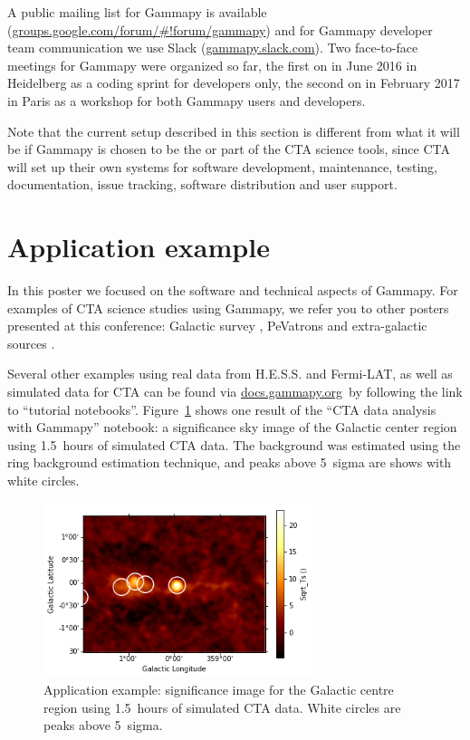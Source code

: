 \documentclass{PoS}
\newcommand{\urlGammapySlack}{\href{https://gammapy.slack.com}{gammapy.slack.com}}
\newcommand{\urlGammapyDocs}{\href{http://docs.gammapy.org}{docs.gammapy.org}}
\newcommand{\urlGammapyForum}{\href{https://groups.google.com/forum/\#!forum/gammapy}{groups.google.com/forum/\#!forum/gammapy}}
\begin{document}
A public mailing list for Gammapy is available (\urlGammapyForum) and for
Gammapy developer team communication we use Slack (\urlGammapySlack). Two
face-to-face meetings for Gammapy were organized so far, the first on in June
2016 in Heidelberg as a coding sprint for developers only, the second on in
February 2017 in Paris as a workshop for both Gammapy users and developers.

Note that the current setup described in this section is different from what it
will be if Gammapy is chosen to be the or part of the CTA science tools, since
CTA will set up their own systems for software development, maintenance,
testing, documentation, issue tracking, software distribution and user support.

\section{Application example}
\label{sec:application}

In this poster we focused on the software and technical aspects of Gammapy. For
examples of CTA science studies using Gammapy, we refer you to other posters
presented at this conference: Galactic survey \cite{roberta}, PeVatrons
\cite{cyril} and extra-galactic sources \cite{julien}.

Several other examples using real data from H.E.S.S. and Fermi-LAT, as well as
simulated data for CTA can be found via \urlGammapyDocs\ by following the link
to ``tutorial notebooks''. Figure~\ref{fig:app} shows one result of the ``CTA
data analysis with Gammapy'' notebook: a significance sky image of the Galactic
center region using 1.5~hours of simulated CTA data. The background was
estimated using the ring background estimation technique, and peaks above
5~sigma are shows with white circles.

\begin{figure}[t]
\centering
\includegraphics[width=0.7\textwidth]{figures/gammapy_example_sky_image.png}
\caption{
Application example: significance image for the Galactic centre region using
1.5~hours of simulated CTA data.  White circles are peaks above 5~sigma.
}
\label{fig:app}
\end{figure}
\end{document}
